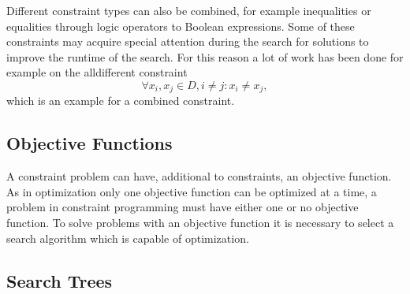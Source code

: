 \documentclass[10pt,
               a4paper,
               journal,
               ]{IEEEtran}
\begin{document}
	Different constraint types can also be combined, for example inequalities or equalities through logic operators to Boolean expressions. Some of these constraints may acquire special attention during the search for solutions to improve the runtime of the search. For this reason a lot of work has been done for example on the alldifferent constraint \cite{allDifferent}
	\begin{equation}
		\forall x_i, x_j \in D, i \ne j: x_i \ne x_j, 
		\label{eq:alldifferent}
	\end{equation}
	which is an example for a combined constraint.
	
	\subsection{Objective Functions}
	A constraint problem can have, additional to constraints, an objective function. As in optimization only one objective function can be optimized at a time, a problem in constraint programming must have either one or no objective function. To solve problems with an objective function it is necessary to select a search algorithm which is capable of optimization.
	
	\subsection{Search Trees}
	
\end{document}
